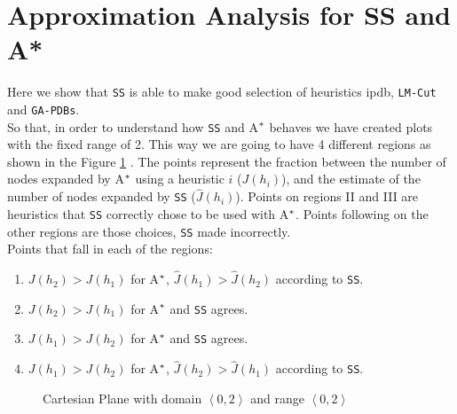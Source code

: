 \section{Approximation Analysis for SS and A*}
\noindent
Here we show that \texttt{SS} is able to make good selection of heuristics ipdb, \texttt{LM-Cut} and \texttt{GA-PDBs}.\\

So that, in order to understand how \texttt{SS} and A$\sp{*}$ behaves we have created plots with the fixed range of 2. This way we are going to have 4 different regions as shown in the Figure \ref{fig:img_cartesian_plane} . The points represent the fraction between the  number of nodes expanded by A$\sp{*}$ using a heuristic $i$ ($J(h_{i})$), and the estimate of the number of nodes expanded by \texttt{SS} ($\hat{J}(h_{i})$). Points on regions II and III are heuristics that \texttt{SS} correctly chose to be used with A$\sp{*}$. Points following on the other regions are those choices, \texttt{SS} made incorrectly.\\

Points that fall in each of the regions:
\begin{enumerate}[label=\Roman*]
\item $J(h_{2}) > J(h_{1})$ for A$\sp{*}$, $\hat{J}(h_{1}) > \hat{J}(h_{2})$ according to \texttt{SS}. 
\item $J(h_{2}) > J(h_{1})$ for A$\sp{*}$ and \texttt{SS} agrees.
\item $J(h_{1}) > J(h_{2})$ for A$\sp{*}$ and \texttt{SS} agrees.
\item $J(h_{1}) > J(h_{2})$ for A$\sp{*}$, $\hat{J}(h_{2}) > \hat{J}(h_{1})$ according to \texttt{SS}.
\end{enumerate}

\pagestyle{empty}

\begin{figure}[!htb]
\centering  
{}
  \caption{Cartesian Plane with domain $\left\langle 0, 2\right\rangle$ and range $\left\langle 0, 2\right\rangle$ }\label{fig:img_cartesian_plane}
\end{figure}

